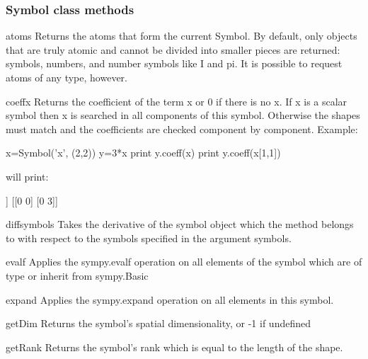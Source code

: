 \subsubsection{Symbol class methods}
\begin{methoddesc}[Symbol]{atoms}{}
Returns the atoms that form the current Symbol.
By default, only objects that are truly atomic and cannot be divided
into smaller pieces are returned: symbols, numbers, and number
symbols like I and pi. It is possible to request atoms of any type,
however.
\end{methoddesc}

\begin{methoddesc}[Symbol]{coeff}{x }
Returns the coefficient of the term x or 0 if there is no x.
If x is a scalar symbol then x is searched in all components of
this symbol. Otherwise the shapes must match and the coefficients are
checked component by component.
Example:
\begin{python}
     x=Symbol('x', (2,2))
     y=3*x
     print y.coeff(x)
     print y.coeff(x[1,1])
\end{python}
will print:
\begin{python}
     [[3 3]
      [3 3]]
     [[0 0]
      [0 3]]
\end{python} 
\end{methoddesc}
\begin{methoddesc}[Symbol]{diff}{symbols}
Takes the derivative of the symbol object which the method belongs to with respect to the symbols specified in the argument symbols.
\end{methoddesc}
\begin{methoddesc}[Symbol]{evalf}{}
Applies the sympy.evalf operation on all elements of the symbol which are of type or inherit from sympy.Basic 
\end{methoddesc}
\begin{methoddesc}[Symbol]{expand}{}
Applies the sympy.expand operation on all elements in this symbol.
\end{methoddesc}
\begin{methoddesc}[Symbol]{getDim}{}
Returns the symbol's spatial dimensionality, or -1 if undefined
\end{methoddesc}
\begin{methoddesc}[Symbol]{getRank}{}
Returns the symbol's rank which is equal to the length of the shape.
\end{methoddesc}
